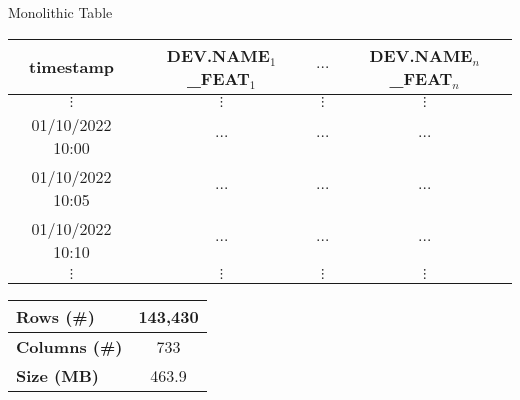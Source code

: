 \begin{frame}{Monolithic Table}
   \begin{table}[]
	\begin{center}
 \footnotesize
		\begin{tabular}[c]{c|c|c|c}
			\multicolumn{1}{c|}{\textbf{timestamp}} & 
            \multicolumn{1}{c|}{\textbf{DEV.NAME$_1$\_FEAT$_1$}} &
            \multicolumn{1}{c|}{$\ldots$} & 
            \multicolumn{1}{c}{\textbf{DEV.NAME$_n$\_FEAT$_n$}}\\
			\hline
            $\vdots$ & $\vdots$ & $\vdots$ & $\vdots$\\
            01/10/2022 10:00 & $\ldots$ & $\ldots$ & $\ldots$\\
            01/10/2022 10:05 & $\ldots$ & $\ldots$ & $\ldots$\\
            01/10/2022 10:10 & $\ldots$ & $\ldots$ & $\ldots$\\
            $\vdots$ & $\vdots$ & $\vdots$ & $\vdots$

		\end{tabular}
	\end{center}
\end{table} 

\begin{table}[]
    \centering
    \begin{tabular}{l|c}
       \textbf{Rows (\#)}     & 143,430\\
       \hline
       \textbf{Columns (\#)}  & 733\\ 
       \hline
       \textbf{Size (MB)} & 463.9
    \end{tabular}

\end{table}
\end{frame}